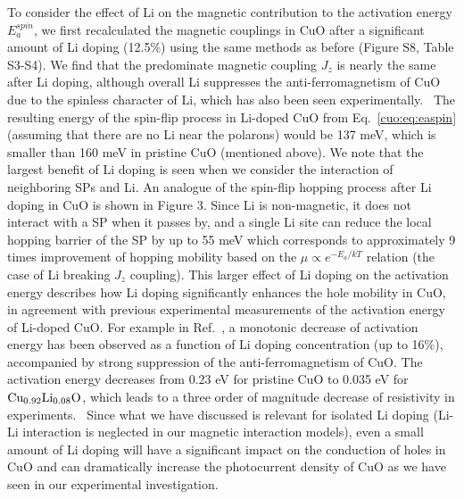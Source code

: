 To consider the effect of Li on the magnetic contribution to the activation energy $E_a^{spin}$, we first recalculated the magnetic couplings in CuO after a significant amount of Li doping (12.5\%) using the same methods as before (Figure S8, Table S3-S4). We find that the predominate magnetic coupling $J_z$ is nearly the same after Li doping, although overall Li suppresses the anti-ferromagnetism of CuO due to the spinless character of Li, which has also been seen experimentally.~\cite{zheng2004fast} The resulting energy of the spin-flip process in Li-doped CuO from Eq.~\ref{cuo:eq:easpin} (assuming that there are no Li near the polarons) would be 137 meV, which is smaller than 160 meV in pristine CuO (mentioned above). We note that the largest benefit of Li doping is seen when we consider the interaction of neighboring SPs and Li. An analogue of the spin-flip hopping process after Li doping in CuO is shown in Figure 3. Since Li is non-magnetic, it does not interact with a SP when it passes by, and a single Li site can reduce the local hopping barrier of the SP by up to 55 meV which corresponds to approximately 9 times improvement of hopping mobility based on the $\mu \propto e^{-E_a/kT}$ relation (the case of Li breaking $J_z$ coupling). This larger effect of Li doping on the activation energy describes how Li doping significantly enhances the hole mobility in CuO, in agreement with previous experimental measurements of the activation energy of Li-doped CuO.\cite{zheng2004fast,gao2007ferromagnetic,zheng2003effect,chiang2016dopant} For example in Ref.~\cite{zheng2004fast}, a monotonic decrease of activation energy has been observed as a function of Li doping concentration (up to 16\%), accompanied by strong suppression of the anti-ferromagnetism of CuO. The activation energy decreases from 0.23 eV for pristine CuO to 0.035 eV for $\rm Cu_{0.92}Li_{0.08}O$, which leads to a three order of magnitude decrease of resistivity in experiments.~\cite{zheng2004fast} Since what we have discussed is relevant for isolated Li doping (Li-Li interaction is neglected in our magnetic interaction models), even a small amount of Li doping will have a significant impact on the conduction of holes in CuO and can dramatically increase the photocurrent density of CuO as we have seen in our experimental investigation.~\cite{chiang2016dopant}


